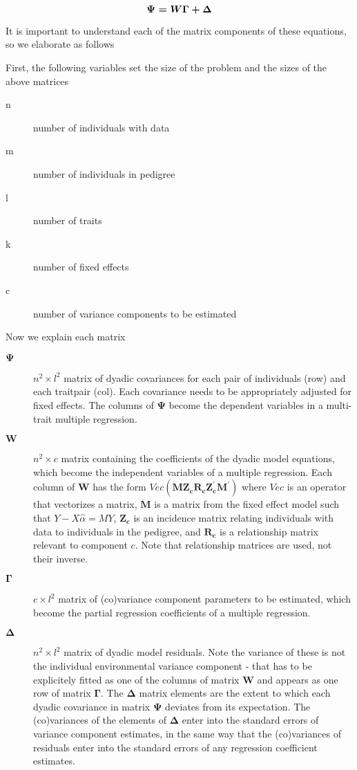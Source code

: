 \documentclass[titlepage]{article}  %
\begin{document}
\begin{equation}
\mbox{\boldmath $\Psi = W \Gamma + \Delta$}   \label{eq.dme}
\end{equation}

It is important to understand each of the matrix components of these equations, so we elaborate as follows

First, the following variables set the size of the problem and the sizes of the above matrices
\begin{description}
\item[n] number of individuals with data
\item[m] number of individuals in pedigree
\item[l] number of traits
\item[k] number of fixed effects
\item[c] number of variance components to be estimated
\end{description}

Now we explain each matrix 
\begin{description}
\item[$\bm{\Psi}$] $n^{2} \times l^{2}$ matrix of dyadic covariances for each pair of individuals (row) and each traitpair (col). Each covariance needs to be appropriately adjusted for fixed effects. The columns of $\bm{\Psi}$ become the dependent variables in a multi-trait multiple regression.
\item[$\bm{W}$] $n^{2} \times c$ matrix containing the coefficients of the dyadic model equations, which become the independent variables of a multiple regression. Each column of $\bm{W}$ has the form $Vec{\bm{(MZ_{c} R_{c} Z_{c}^{\prime}M^{\prime})}}$ where $Vec$ is an operator that vectorizes a matrix, $\bm{M}$ is a matrix from the fixed effect model such that \mbox{\boldmath $Y - X \hat{\alpha} = M Y$}, $\bm{Z_{c}}$ is an incidence matrix relating individuals with data to individuals in the pedigree, and $\bm{R_{c}}$ is a relationship matrix relevant to component $c$. Note that relationship matrices are used, not their inverse.
\item[$\bm{\Gamma}$] $c \times l^{2}$ matrix of (co)variance component parameters to be estimated, which become the partial regression coefficients of a multiple regression.
\item[$\bm{\Delta}$] $n^{2} \times l^{2}$ matrix of dyadic model residuals. Note the variance of these is not the individual environmental variance component - that has to be explicitely fitted as one of the columns of matrix $\bm{W}$ and appears as one row of matrix $\bm{\Gamma}$. The $\bm{\Delta}$ matrix elements are the extent to which each dyadic covariance in matrix $\bm{\Psi}$ deviates from its expectation. The (co)variances of the elements of $\bm{\Delta}$ enter into the standard errors of variance component estimates, in the same way that the (co)variances of residuals enter into the standard errors of any regression coefficient estimates. 
\end{description}
\end{document}
